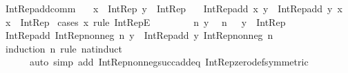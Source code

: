 \begin{isabellebody}
\ Int{\isacharunderscore}{\kern0pt}Rep{\isacharunderscore}{\kern0pt}add{\isacharunderscore}{\kern0pt}comm{\isacharcolon}{\kern0pt}\isanewline
\ \ \ {\isachardoublequoteopen}x\ {\isacharcolon}{\kern0pt}\ Int{\isacharunderscore}{\kern0pt}Rep{\isachardoublequoteclose}\ {\isachardoublequoteopen}y\ {\isacharcolon}{\kern0pt}\ Int{\isacharunderscore}{\kern0pt}Rep{\isachardoublequoteclose}\isanewline
\ \ \ {\isachardoublequoteopen}Int{\isacharunderscore}{\kern0pt}Rep{\isacharunderscore}{\kern0pt}add\ x\ y\ {\isacharequal}{\kern0pt}\ Int{\isacharunderscore}{\kern0pt}Rep{\isacharunderscore}{\kern0pt}add\ y\ x{\isachardoublequoteclose}\isanewline
%
\isadelimproof
%
\endisadelimproof
%
\isatagproof
{}\isamarkupfalse%
\ {\isacartoucheopen}x\ {\isacharcolon}{\kern0pt}\ Int{\isacharunderscore}{\kern0pt}Rep{\isacartoucheclose}\isanewline
{}\isamarkupfalse%
\ {\isacharparenleft}{\kern0pt}cases\ x\ rule{\isacharcolon}{\kern0pt}\ Int{\isacharunderscore}{\kern0pt}RepE{\isacharparenright}{\kern0pt}\isanewline
\ \ \isacommand{{\isacharbraceleft}{\kern0pt}}\isamarkupfalse%
\isanewline
\ \ \ \ \isamarkupfalse%
\ n\ y\ \isamarkupfalse%
\ {\isachardoublequoteopen}n\ {\isasymin}\ {\isasymnat}{\isachardoublequoteclose}\ {\isachardoublequoteopen}y\ {\isacharcolon}{\kern0pt}\ Int{\isacharunderscore}{\kern0pt}Rep{\isachardoublequoteclose}\isanewline
\ \ \ \ \isamarkupfalse%
\ \isamarkupfalse%
\ {\isachardoublequoteopen}Int{\isacharunderscore}{\kern0pt}Rep{\isacharunderscore}{\kern0pt}add\ {\isacharparenleft}{\kern0pt}Int{\isacharunderscore}{\kern0pt}Rep{\isacharunderscore}{\kern0pt}nonneg\ n{\isacharparenright}{\kern0pt}\ y\ {\isacharequal}{\kern0pt}\ Int{\isacharunderscore}{\kern0pt}Rep{\isacharunderscore}{\kern0pt}add\ y\ {\isacharparenleft}{\kern0pt}Int{\isacharunderscore}{\kern0pt}Rep{\isacharunderscore}{\kern0pt}nonneg\ n{\isacharparenright}{\kern0pt}{\isachardoublequoteclose}\isanewline
\ \ \ \ \isamarkupfalse%
\ {\isacharparenleft}{\kern0pt}induction\ n\ rule{\isacharcolon}{\kern0pt}\ nat{\isacharunderscore}{\kern0pt}induct{\isacharparenright}{\kern0pt}\isanewline
\ \ \ \ \ \ {\isacharparenleft}{\kern0pt}auto\ simp\ add{\isacharcolon}{\kern0pt}\ Int{\isacharunderscore}{\kern0pt}Rep{\isacharunderscore}{\kern0pt}nonneg{\isacharunderscore}{\kern0pt}succ{\isacharunderscore}{\kern0pt}add{\isacharunderscore}{\kern0pt}eq\ Int{\isacharunderscore}{\kern0pt}Rep{\isacharunderscore}{\kern0pt}zero{\isacharunderscore}{\kern0pt}def{\isacharbrackleft}{\kern0pt}symmetric{\isacharbrackright}{\kern0pt}\isanewline

\end{isabellebody}
